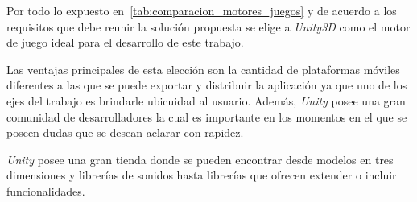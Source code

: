 Por todo lo expuesto en~\ref{tab:comparacion_motores_juegos} y de acuerdo a los
requisitos que debe reunir la solución propuesta se elige a \textit{Unity3D}
como el motor de juego ideal para el desarrollo de este trabajo.

Las ventajas principales de esta elección son la cantidad de plataformas móviles
diferentes a las que se puede exportar y distribuir la aplicación ya que uno de
los ejes del trabajo es brindarle ubicuidad al usuario. Además, \textit{Unity}
posee una gran comunidad de desarrolladores la cual es importante en los
momentos en el que se poseen dudas que se desean aclarar con rapidez.

\textit{Unity} posee una gran tienda donde se pueden encontrar desde modelos en
tres dimensiones y librerías de sonidos hasta librerías que ofrecen extender o
incluir funcionalidades. 
